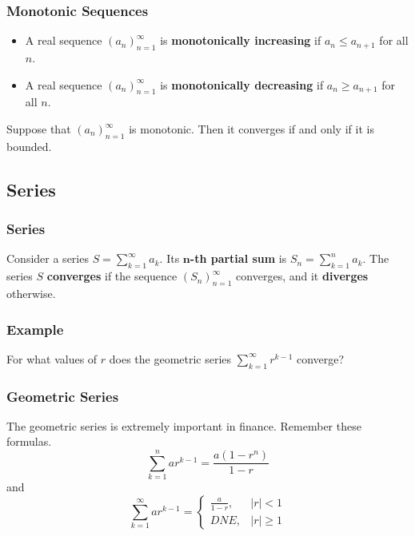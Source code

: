 \documentclass{beamer}
\begin{document}
\begin{frame}
\frametitle{Monotonic Sequences}

\begin{Definition}
\begin{itemize}
\item A real sequence $(a_n)_{n = 1}^\infty$ is {\bf monotonically increasing} if $a_n \leq a_{n + 1}$ for all $n$.
\item A real sequence $(a_n)_{n = 1}^\infty$ is {\bf monotonically decreasing} if $a_n \geq a_{n + 1}$ for all $n$.
\end{itemize}
\end{Definition}

\begin{Theorem}
Suppose that  $(a_n)_{n = 1}^\infty$ is monotonic. Then it converges if and only if it is bounded.
\end{Theorem}
\end{frame}

\subsection{Series}

\begin{frame}
\frametitle{Series}
\begin{Definition}
Consider a series $\displaystyle S = \sum_{k = 1}^\infty a_k$. Its {\bf $\boldsymbol n$-th partial sum} is $\displaystyle S_n = \sum_{k = 1}^n a_k$. The series $S$ {\bf converges} if the sequence $(S_n)_{n = 1}^\infty$ converges, and it {\bf diverges} otherwise.
 \end{Definition}
 \end{frame}
 
 \begin{frame}[t]
 \frametitle{Example}
 \begin{Example}
 For what values of $r$ does the geometric series $\displaystyle\sum_{k = 1}^\infty r^{k - 1}$ converge?
 \end{Example}
 \end{frame}
 
 \begin{frame}
 \frametitle{Geometric Series}
 The geometric series is extremely important in finance. Remember these formulas. 
 $$
 \sum_{k= 1}^n a r^{k -1} = \frac{a(1 - r^n)}{1 - r}
 $$
 and
 $$
  \sum_{k = 1}^\infty a r^{k -1} =\begin{cases} \frac{a}{1 - r}, & |r| < 1\\ DNE,	& |r| \geq 1\end{cases}
 $$
  \end{frame}
  
\end{document}
